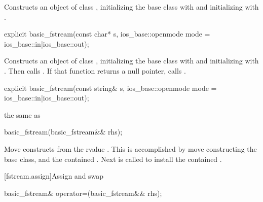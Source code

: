 \begin{itemdescr}
\pnum
\effects
Constructs an object of class
,
initializing the base class with
and initializing
with
.
\end{itemdescr}

%
\begin{itemdecl}
explicit basic_fstream(const char* s,
    ios_base::openmode mode = ios_base::in|ios_base::out);
\end{itemdecl}

\begin{itemdescr}
\pnum
\effects
Constructs an object of class
,
initializing the base class with
and initializing
with
.
Then calls
.
If that function returns a null pointer, calls
.
\end{itemdescr}

%
\begin{itemdecl}
explicit basic_fstream(const string& s,
    ios_base::openmode mode = ios_base::in|ios_base::out);
\end{itemdecl}

\begin{itemdescr}
\pnum
\effects the same as 
\end{itemdescr}

%
\begin{itemdecl}
basic_fstream(basic_fstream&& rhs);
\end{itemdecl}

\begin{itemdescr}
\pnum
\effects Move constructs from the rvalue . This
is accomplished by move constructing the base class, and the contained
. Next
 is called to install
the contained .
\end{itemdescr}

[fstream.assign]{Assign and swap}

%
%
\begin{itemdecl}
basic_fstream& operator=(basic_fstream&& rhs);
\end{itemdecl}

